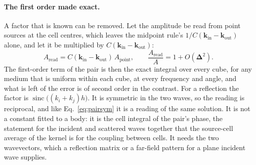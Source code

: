 \documentclass[11pt,a4paper]{article}
\newcommand{\bD}{\boldsymbol{\Delta}}
\newcommand{\sinc}{\operatorname{sinc}}
\begin{document}
\paragraph{The first order made exact.} A factor that is known can be removed. Let the amplitude be read
from point sources at the cell centres, which leaves the midpoint rule's
$1/C(\mathbf{k}_{\text{in}}-\mathbf{k}_{\text{out}})$ alone, and let it be multiplied by
$C(\mathbf{k}_{\text{in}}-\mathbf{k}_{\text{out}})$:
\begin{equation}\label{eq:firstorder}
  A_{\text{read}}=C(\mathbf{k}_{\text{in}}-\mathbf{k}_{\text{out}})\,A_{\text{point}},
  \qquad
  \frac{A_{\text{read}}}{A}=1+O(\bD^2).
\end{equation}
The first-order term of the pair is then the exact integral over every cube, for any medium that is
uniform within each cube, at every frequency and angle, and what is left of the error is of second order
in the contrast. For a reflection the factor is $\sinc\bigl((k_i+k_j)h\bigr)$. It is symmetric in the two
waves, so the reading is reciprocal, and like Eq.~\eqref{eq:pairsym} it is a reading of the same solution.
It is not a constant fitted to a body: it is the cell integral of the pair's phase, the statement for the
incident and scattered waves together that the source-cell average of the kernel is for the coupling
between cells. It needs the two wavevectors, which a reflection matrix or a far-field pattern for a plane
incident wave supplies.
\end{document}
